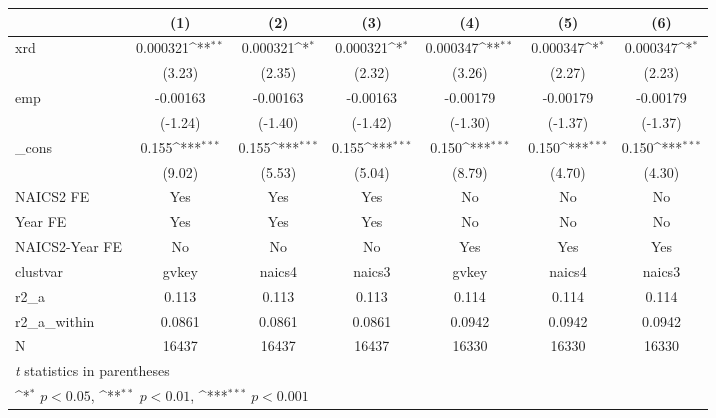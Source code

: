 {
\def\sym#1{\ifmmode^{#1}\else\(^{#1}\)\fi}
\begin{tabular}{l*{6}{c}}
\hline\hline
            &\multicolumn{1}{c}{(1)}         &\multicolumn{1}{c}{(2)}         &\multicolumn{1}{c}{(3)}         &\multicolumn{1}{c}{(4)}         &\multicolumn{1}{c}{(5)}         &\multicolumn{1}{c}{(6)}         \\
\hline
xrd         &    0.000321\sym{**} &    0.000321\sym{*}  &    0.000321\sym{*}  &    0.000347\sym{**} &    0.000347\sym{*}  &    0.000347\sym{*}  \\
            &      (3.23)         &      (2.35)         &      (2.32)         &      (3.26)         &      (2.27)         &      (2.23)         \\
[1em]
emp         &    -0.00163         &    -0.00163         &    -0.00163         &    -0.00179         &    -0.00179         &    -0.00179         \\
            &     (-1.24)         &     (-1.40)         &     (-1.42)         &     (-1.30)         &     (-1.37)         &     (-1.37)         \\
[1em]
\_cons      &       0.155\sym{***}&       0.155\sym{***}&       0.155\sym{***}&       0.150\sym{***}&       0.150\sym{***}&       0.150\sym{***}\\
            &      (9.02)         &      (5.53)         &      (5.04)         &      (8.79)         &      (4.70)         &      (4.30)         \\
[1em]
NAICS2 FE   &         Yes         &         Yes         &         Yes         &          No         &          No         &          No         \\
[1em]
Year FE     &         Yes         &         Yes         &         Yes         &          No         &          No         &          No         \\
[1em]
NAICS2-Year FE&          No         &          No         &          No         &         Yes         &         Yes         &         Yes         \\
\hline
clustvar    &       gvkey         &      naics4         &      naics3         &       gvkey         &      naics4         &      naics3         \\
r2\_a        &       0.113         &       0.113         &       0.113         &       0.114         &       0.114         &       0.114         \\
r2\_a\_within &      0.0861         &      0.0861         &      0.0861         &      0.0942         &      0.0942         &      0.0942         \\
N           &       16437         &       16437         &       16437         &       16330         &       16330         &       16330         \\
\hline\hline
\multicolumn{7}{l}{\footnotesize \textit{t} statistics in parentheses}\\
\multicolumn{7}{l}{\footnotesize \sym{*} \(p<0.05\), \sym{**} \(p<0.01\), \sym{***} \(p<0.001\)}\\
\end{tabular}
}
